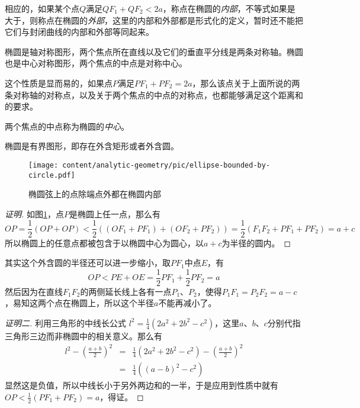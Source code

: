 相应的，如果某个点$Q$满足$QF_1+QF_2<2a$，称点在椭圆的\emph{内部}，不等式如果是大于，则称点在椭圆的\emph{外部}，这里的内部和外部都是形式化的定义，暂时还不能把它们与封闭曲线的内部和外部等同起来。

\begin{property}
  椭圆是轴对称图形，两个焦点所在直线以及它们的垂直平分线是两条对称轴。椭圆也是中心对称图形，两个焦点的中点是对称中心。
\end{property}

这个性质是显而易的，如果点$P$满足$PF_1+PF_2=2a$，那么该点关于上面所说的两条对称轴的对称点，以及关于两个焦点的中点的对称点，也都能够满足这个距离和的要求。

两个焦点的中点称为椭圆的\emph{中心}。

\begin{property}
  椭圆是有界图形，即存在外含矩形或者外含圆。
\end{property}

\begin{figure}[htbp]
  \centering
\texttt{[image: content/analytic-geometry/pic/ellipse-bounded-by-circle.pdf]}
\caption{椭圆弦上的点除端点外都在椭圆内部}
\label{fig:ellipse-bounded-by-circle}
\end{figure}

\begin{proof}[证明]
  如图\ref{fig:ellipse-bounded-by-circle}，点$P$是椭圆上任一点，那么有
  \begin{equation*}
    OP = \frac{1}{2}(OP + OP) < \frac{1}{2} ((OF_1+PF_1) + (OF_2+PF_2))
    = \frac{1}{2} (F_1F_2 + PF_1 + PF_2) = a+c
  \end{equation*}
  所以椭圆上的任意点都被包含于以椭圆中心为圆心，以$a+c$为半径的圆内。
\end{proof}

  其实这个外含圆的半径还可以进一步缩小，取$PF_1$中点$E$，有
  \begin{equation*}
    OP < PE + OE = \frac{1}{2} PF_1 + \frac{1}{2} PF_2 = a
  \end{equation*}
  然后因为在直线$F_1F_2$的两侧延长线上各有一点$P_1$、$P_2$，使得$P_1F_1=P_2F_2=a-c$，易知这两个点在椭圆上，所以这个半径$a$不能再减小了。

  \begin{proof}[证明二]
    利用三角形的中线长公式 $l^2 = \frac{1}{4}(2a^2+2b^2-c^2)$，这里$a$、$b$、$c$分别代指三角形三边而非椭圆中的相关意义。那么有
    \begin{eqnarray*}
      l^2 - \left( \frac{a+b}{2} \right)^2 & = &  \frac{1}{4}(2a^2+2b^2-c^2) - \left( \frac{a+b}{2} \right)^2 \\
      & = & \frac{1}{4} \left( (a-b)^2 - c^2 \right)
    \end{eqnarray*}
    显然这是负值，所以中线长小于另外两边和的一半，于是应用到性质中就有 $OP < \frac{1}{2} (PF_1+PF_2) = a$，得证。
  \end{proof}

